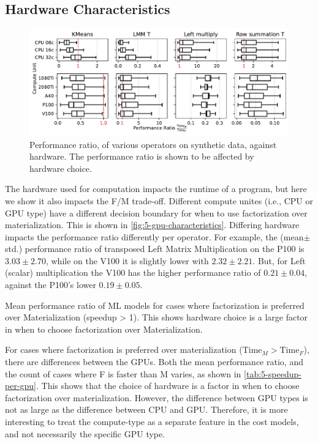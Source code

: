 \subsection{Hardware Characteristics}
\begin{figure}[ht]
    \centering
    \includegraphics[width=\linewidth]{chapters/05_cost_estimation/figures/motivation_speedup_per_operator_per_gpu.pdf}
    \caption[Performance ratio plotted against hardware]{Performance ratio, of various operators on synthetic data, against hardware. The performance ratio is shown to be affected by hardware choice.}
    \label{fig:5-gpu-characteristics}
\end{figure}
The hardware used for computation impacts the runtime of a program, but here we show it also impacts the F/M trade-off. Different compute unites (i.e., CPU or GPU type) have a different decision boundary for when to use factorization over materialization. This is shown in \autoref{fig:5-gpu-characteristics}. Differing hardware impacts the performance ratio differently per operator. For example, the (mean$\pm$std.) performance ratio of transposed Left Matrix Multiplication on the P100 is $3.03\pm2.70$, while on the V100 it is slightly lower with $2.32\pm2.21$. But, for Left (scalar) multiplication the V100 has the higher performance ratio of $0.21\pm0.04$, against the P100's lower $0.19\pm0.05$.

\begin{table}[ht]
    \centering
    
    \caption[Performance ratio of ML models for cases where factorization has positive impact.]{Mean performance ratio of ML models for cases where factorization is preferred over Materialization (speedup > 1). This shows hardware choice is a large factor in when to choose factorization over Materialization.}
    \label{tab:5-speedup-per-gpu}
\end{table}

For cases where factorization is preferred over materialization ($\text{Time}_M > \text{Time}_F$), there are differences between the GPUs. Both the mean performance ratio, and the count of cases where F is faster than M varies, as shown in \autoref{tab:5-speedup-per-gpu}. This shows that the choice of hardware is a factor in when to choose factorization over materialization. However, the difference between GPU types is not as large as the difference between CPU and GPU. Therefore, it is more interesting to treat the compute-type as a separate feature in the cost models, and not necessarily the specific GPU type.

